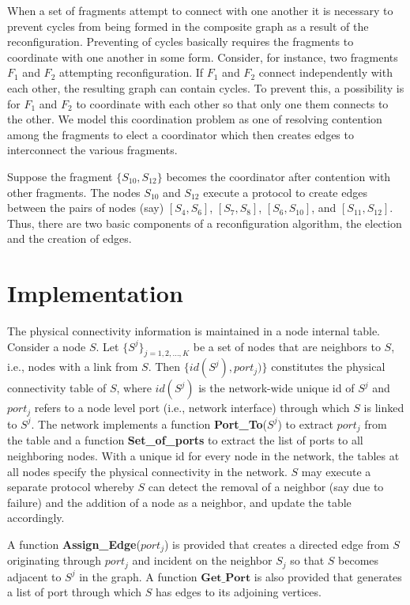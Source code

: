 \documentclass[a4paper,12pt]{article}
\newcommand{\<}{\langle}
\renewcommand{\>}{\rangle}
\theoremstyle{definition}
\begin{document}
When a set of fragments attempt to connect with one another it is necessary to prevent cycles from being formed in the composite graph as a result of the reconfiguration. Preventing of cycles basically requires the fragments to coordinate with one another in some form. Consider, for instance, two fragments $F_{1}$ and $F_{2}$ attempting reconfiguration. If $F_{1}$ and $F_{2}$ connect independently with each other, the resulting graph can contain cycles. To prevent this, a possibility is for $F_{1}$ and $F_{2}$ to coordinate with each other so that only one them connects to the other. We model this coordination problem as one of resolving contention among the fragments to elect a coordinator which then creates edges to interconnect the various fragments. 

Suppose the fragment $\{S_{10}, S_{12}\}$ becomes the coordinator after contention with other fragments. The nodes $S_{10}$ and $S_{12}$ execute a protocol to create edges between the pairs of nodes (say) $[S_4, S_6]$, $[S_7, S_8]$, $[S_6, S_10]$, and $[S_{11}, S_{12}]$. Thus, there are two basic components of a reconfiguration algorithm, the election and the creation of edges. 

\section{Implementation}

The physical connectivity information is maintained in a node internal table. Consider a node $S$. Let $\{S^{j}\}_{j=1,2,\dots,K}$ be a set of nodes that are neighbors to $S$, i.e., nodes with a link from $S$. Then $\{id(S^{j}), port_{j})\}$ constitutes the physical connectivity table of $S$, where $id(S^{j})$ is the network-wide unique id of $S^{j}$ and $port_{j}$ refers to a node level port (i.e., network interface) through which $S$ is linked to $S^{j}$. The network implements a function \textbf{Port\_To}($S^j$) to extract $port_{j}$ from the table and a function \textbf{Set\_of\_ports} to extract the list of ports to all neighboring nodes. With a unique id for every node in the network, the tables at all nodes specify the physical connectivity in the network. $S$ may execute a separate protocol whereby $S$ can detect the removal of a neighbor (say due to failure) and the addition of a node as a neighbor, and update the table accordingly. 

A function \textbf{Assign\_Edge}($port_j$) is provided that creates a directed edge from $S$ originating through $port_j$ and incident on the neighbor $S_{j}$ so that $S$ becomes adjacent to $S^{j}$ in the graph. A function $\textbf{Get\_Port}$ is also provided that generates a list of port through which $S$ has edges to its adjoining vertices. 
\end{document}
